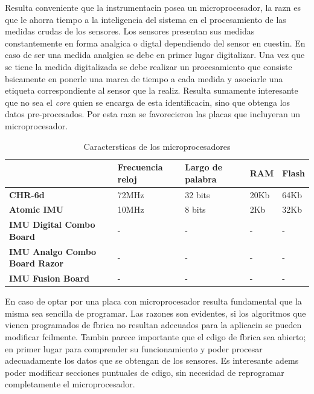 \documentclass[spanish,12pt,a4paper,titlepage]{report}
\begin{document}
Resulta conveniente que la instrumentacin posea un microprocesador, la razn es que le ahorra tiempo a la inteligencia del sistema en el procesamiento de las medidas crudas de los sensores. Los sensores presentan sus medidas constantemente en forma analgica o digtal dependiendo del sensor en cuestin. En caso de ser una medida analgica se debe en primer lugar digitalizar. Una vez que se tiene la medida digitalizada se debe realizar un procesamiento que consiste bsicamente en ponerle una marca de tiempo a cada medida y asociarle una etiqueta correspondiente al sensor que la realiz. 
Resulta sumamente interesante que no sea el \emph{core} quien se encarga de esta identificacin, sino que obtenga los datos pre-procesados. Por esta razn se favorecieron las placas que incluyeran un microprocesador. 


\begin{table}[H]
\begin{tabular}{p{110pt}|p{65pt}|p{65pt}|p{60pt}|p{60pt}|} 

\cline{2-5} 
& \cellcolor[gray]{0.8} \textbf{Frecuencia reloj} 
& \cellcolor[gray]{0.8} \textbf{Largo de palabra}
& \cellcolor[gray]{0.8} \textbf{RAM} 
& \cellcolor[gray]{0.8} \textbf{Flash}\\ \cline{2-5} \hline
\multicolumn{1}{|p{110pt}|}{\cellcolor[gray]{0.8}\textbf{CHR-6d}}
&  72MHz &  32 bits &  20Kb &  64Kb \\ \hline
\multicolumn{1}{|p{110pt}|}{\cellcolor[gray]{0.8}\textbf{Atomic IMU}}
&  10MHz  &  8 bits &  2Kb  &  32Kb \\ \hline
\multicolumn{1}{|p{110pt}|}{\cellcolor[gray]{0.8}\textbf{IMU Digital Combo Board}}
&  - &  - &  -  &  -\\ \hline
\multicolumn{1}{|p{110pt}|}{\cellcolor[gray]{0.8}\textbf{IMU Analgo Combo Board Razor}}
&  - &  -  &  - &  -\\ \hline
\multicolumn{1}{|p{110pt}|}{\cellcolor[gray]{0.8}\textbf{IMU Fusion Board}}
&  - &  -  &  - &  -\\
\hline 
\end{tabular}
\caption{Caractersticas de los microprocesadores}
\label{tab:micro}
\end{table}

En caso de optar por una placa con microprocesador resulta fundamental que la misma sea sencilla de programar. Las razones son evidentes, si los algoritmos que vienen programados de fbrica no resultan adecuados para la aplicacin se pueden modificar fcilmente. Tambin parece importante que el cdigo de fbrica sea abierto; en primer lugar para comprender su funcionamiento y poder procesar adecuadamente los datos que se obtengan de los sensores. Es interesante adems poder modificar secciones puntuales de cdigo, sin necesidad de reprogramar completamente el microprocesador. 
\end{document}
